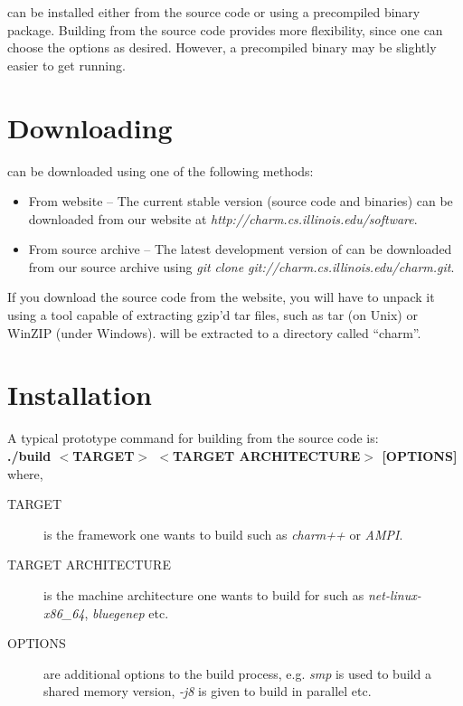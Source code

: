 \charmpp{} can be installed either from the source code or using a precompiled
binary package. Building from the source code provides more flexibility, since one 
can choose the options as desired. However, a precompiled binary may be slightly
easier to get running.
 
\section{Downloading \charmpp{}}

\charmpp{} can be downloaded using one of the following methods:

\begin{itemize}
\item From \charmpp{} website -- The current stable version (source code and
binaries) can be downloaded from our website at {\em http://charm.cs.illinois.edu/software}.
\item From source archive -- The latest development version of \charmpp{} can be downloaded
from our source archive using {\em git clone git://charm.cs.illinois.edu/charm.git}.
\end{itemize}

If you download the source code from the website, you will have to unpack it 
using a tool capable of extracting gzip'd tar files, such as tar (on Unix) 
or WinZIP (under Windows).  \charmpp{} will be extracted to a directory 
called ``charm''. 

\section{Installation}

A typical prototype command for building \charmpp{} from the source code is:
\vspace{5pt}\\
{\bf ./build $<$TARGET$>$ $<$TARGET ARCHITECTURE$>$ [OPTIONS]} where,

\begin{description}
\item [TARGET] is the framework one wants to build such as {\em charm++} or {\em
AMPI}.
\item [TARGET ARCHITECTURE] is the machine architecture one wants to build for
such as {\em net-linux-x86\_64}, {\em bluegenep} etc.
\item [OPTIONS] are additional options to the build process, e.g. {\em smp} is
used to build a shared memory version, {\em -j8} is given to build in parallel
etc.
\end {description}

